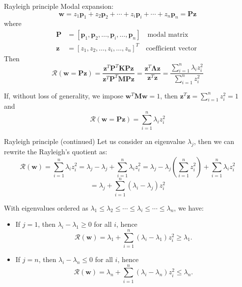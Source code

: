 \documentclass[aspectratio=169]{beamer}
\begin{document}
\begin{frame}{Rayleigh principle}
  Modal expansion:
  \[
    \mathbf{w} = z_1 \mathbf{p}_1 + z_2 \mathbf{p}_2 + \cdots + z_i \mathbf{p}_i + \cdots + z_n \mathbf{p}_n = \mathbf{Pz}
  \]
  where
  \begin{align*}
    \mathbf{P} & = [\mathbf{p}_1, \mathbf{p}_2, \dots, \mathbf{p}_i, \dots, \mathbf{p}_n] \quad \text{modal matrix} \\
    \mathbf{z} & = [z_1, z_2, \dots, z_i, \dots, z_n]^T \quad \text{coefficient vector }
  \end{align*}
  Then
  \[
    \mathcal{R}(\mathbf{w} = \mathbf{Pz}) = \frac{\mathbf{z}^T \mathbf{P}^T \mathbf{K} \mathbf{Pz}}{\mathbf{z}^T \mathbf{P}^T \mathbf{M} \mathbf{Pz}} = \frac{\mathbf{z}^T \mathbf{\Lambda} \mathbf{z}}{\mathbf{z}^T \mathbf{z}} =
    \frac{\sum_{i=1}^n \lambda_i z_i^2}{\sum_{i=1}^n z_i^2}
  \]

  \bigskip
  If, without loss of generality, we impose \( \mathbf{w}^T \mathbf{M} \mathbf{w} = 1 \), then $ \mathbf{z}^T \mathbf{z} = \sum_{i=1}^n z_i^2 = 1$ and
  $$ \mathcal{R}(\mathbf{w} = \mathbf{Pz}) = \sum_{i=1}^n \lambda_i z_i^2 $$

\end{frame}

\begin{frame}{Rayleigh principle (continued)}
  Let us consider an eigenvalue \( \lambda_j \), then we can rewrite the Rayleigh's quotient as:
  \[
    \mathcal{R}(\mathbf{w}) = \sum_{i=1}^n \lambda_i z_i^2 = \lambda_j - \lambda_j + \sum_{i=1}^n \lambda_i z_i^2 = \lambda_j - \lambda_j \left( \sum_{i=1}^n z_i^2 \right) + \sum_{i=1}^n \lambda_i z_i^2
  \]
  \[
    = \lambda_j + \sum_{i=1}^n (\lambda_i - \lambda_j) z_i^2
  \]

  \bigskip

  With eigenvalues ordered as \( \lambda_1 \leq \lambda_2 \leq \cdots \leq \lambda_i \leq \cdots \leq \lambda_n \), we have:
  \begin{itemize}
    \item If \( j = 1 \), then \( \lambda_i - \lambda_1 \geq 0 \) for all \( i \), hence
          \[
            \mathcal{R}(\mathbf{w}) = \lambda_1 + \sum_{i=1}^n (\lambda_i - \lambda_1) z_i^2 \geq \lambda_1.
          \]
    \item If \( j = n \), then \( \lambda_i - \lambda_n \leq 0 \) for all \( i \), hence
          \[
            \mathcal{R}(\mathbf{w}) = \lambda_n + \sum_{i=1}^n (\lambda_i - \lambda_n) z_i^2 \leq \lambda_n.
          \]
  \end{itemize}
\end{frame}
\end{document}
